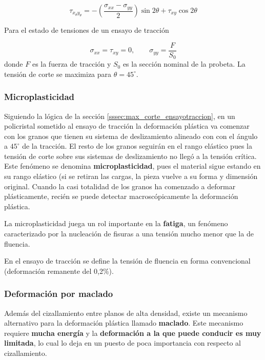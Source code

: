 \begin{equation} \label{eq:plane_stress_transform}
	\tau_{x_\theta y_\theta} = - \left( \frac{\sigma_{xx} - \sigma_{yy}}{2} \right) \sin 2\theta + \tau_{xy} \cos 2 \theta
\end{equation}

Para el estado de tensiones de un ensayo de tracción 

\begin{equation}
	\sigma_{xx} = \tau_{xy} = 0,\qquad \sigma_{yy} = \frac{F}{S_0} 
\end{equation}
donde $F$ es la fuerza de tracción y $S_0$ es la sección nominal de la probeta. La tensión de corte se maximiza para $\theta =  45^\circ$.

\subsubsection{Microplasticidad}

Siguiendo la lógica de la sección \ref{sssec:max_corte_ensayotraccion}, en un policristal sometido al ensayo de tracción la deformación plástica va comenzar con los granos que tienen su sistema de deslizamiento alineado con con el ángulo a $45^\circ$ de la tracción. El resto de los granos seguirán en el rango elástico pues la tensión de corte sobre sus sistemas de deslizamiento no llegó a la tensión crítica. Este fenómeno se denomina \textbf{microplasticidad}, pues el material sigue estando en su rango elástico (si se retiran las cargas, la pieza vuelve a su forma y dimensión original. Cuando la casi totalidad de los granos ha comenzado a deformar plásticamente, recién se puede detectar macroscópicamente la deformación plástica.

La microplasticidad juega un rol importante en la \textbf{fatiga}, un fenómeno caracterizado por la nucleación de fisuras a una tensión mucho menor que la de fluencia.

En el ensayo de tracción se define la tensión de fluencia en forma convencional (deformación remanente del 0,2\%).

\subsubsection{Deformación por maclado}

Además del cizallamiento entre planos de alta densidad, existe un mecanismo alternativo para la deformación plástica llamado \textbf{maclado}. Este mecanismo requiere \textbf{mucha energía} y la \textbf{deformación a la que puede conducir es muy limitada}, lo cual lo deja en un puesto de poca importancia con respecto al cizallamiento.





